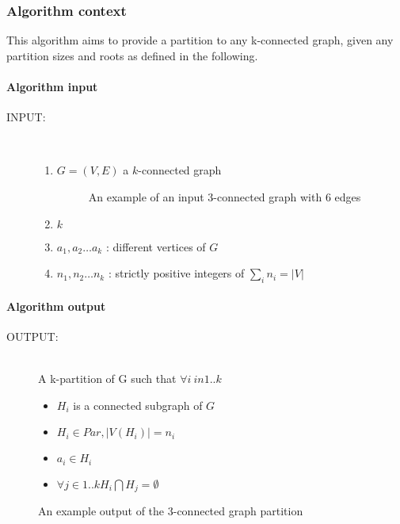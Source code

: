  \subsubsection{Algorithm context}
This algorithm aims to provide a partition to any k-connected graph, given any partition sizes and roots as defined in the following.

\paragraph{Algorithm input}
 \begin{description}
  \item [INPUT:] \hfill \\
    \begin{enumerate}
    \item $G = (V, E)$ a $k$-connected graph 
      \begin{figure}[H]
	\begin{center}
	  
	\end{center}
	\caption{An example of an input 3-connected graph with 6 edges}
      \end{figure}
    \item $k$
    \item $a_1, a_2 \ldots a_k$ : different vertices of $G$
    \item $n_1, n_2 \ldots n_k$ : strictly positive integers of $\sum_i n_i =  |V|$
    \end{enumerate}
    
  \end{description}

\paragraph{Algorithm output}
       \begin{description}
                \item[OUTPUT:] \hfill \\
                        A k-partition of G such that $\forall i \ in 1..k$ 
                        \begin{itemize} 
                                \item $H_i$ is a connected subgraph of $G$
                                \item $H_i \in Par, |V(H_i)| = n_i $
                                \item $a_i \in H_i $
                                \item $\forall j \in 1..k H_i \bigcap H_j = \emptyset$
                        \end{itemize}
        \end{description}
             \begin{figure}[H]
	       \begin{center}
	         
	       \end{center}
	       \caption{An example output of the 3-connected graph partition}
             \end{figure}
